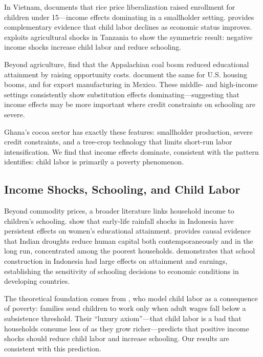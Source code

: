 \documentclass[12pt]{article}
\begin{document}
In Vietnam, \citet{edmonds2005} documents that rice price liberalization raised enrollment for children under 15---income effects dominating in a smallholder setting. \citet{edmonds2005b} provides complementary evidence that child labor declines as economic status improves. \citet{beegle2006} exploits agricultural shocks in Tanzania to show the symmetric result: negative income shocks increase child labor and reduce schooling.

Beyond agriculture, \citet{black2005} find that the Appalachian coal boom reduced educational attainment by raising opportunity costs. \citet{charles2018} document the same for U.S. housing booms, and \citet{atkin2016} for export manufacturing in Mexico. These middle- and high-income settings consistently show substitution effects dominating---suggesting that income effects may be more important where credit constraints on schooling are severe.

Ghana's cocoa sector has exactly these features: smallholder production, severe credit constraints, and a tree-crop technology that limits short-run labor intensification. We find that income effects dominate, consistent with the pattern \citet{edmonds2008} identifies: child labor is primarily a poverty phenomenon.

\subsection{Income Shocks, Schooling, and Child Labor}

Beyond commodity prices, a broader literature links household income to children's schooling. \citet{maccini2009} show that early-life rainfall shocks in Indonesia have persistent effects on women's educational attainment. \citet{shah2017} provides causal evidence that Indian droughts reduce human capital both contemporaneously and in the long run, concentrated among the poorest households. \citet{duflo2001} demonstrates that school construction in Indonesia had large effects on attainment and earnings, establishing the sensitivity of schooling decisions to economic conditions in developing countries.

The theoretical foundation comes from \citet{basu1998}, who model child labor as a consequence of poverty: families send children to work only when adult wages fall below a subsistence threshold. Their ``luxury axiom''---that child labor is a bad that households consume less of as they grow richer---predicts that positive income shocks should reduce child labor and increase schooling. Our results are consistent with this prediction.
\end{document}
